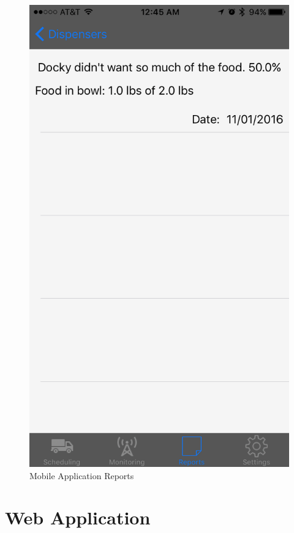 \documentclass[12pt]{article}
\begin{document}
\begin{appendix}
  \begin{figure}[!htb]
    \begin{center}
        \includegraphics[scale=0.15]{Figures/iOSApp5.png}
    \end{center}
    \caption{Mobile Application Reports}
    \label{fig:iOSApp5}
  \end{figure}

  \section{Web Application} \label{App:WebApplication}


\end{appendix}
\end{document}
